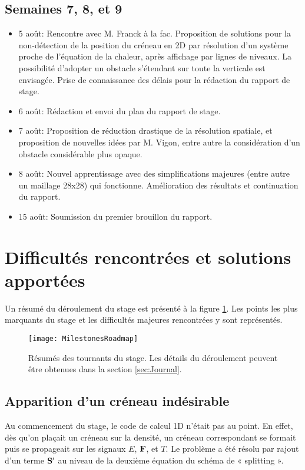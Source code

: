 \subsection{Semaines 7, 8, et 9}
\begin{itemize}
 \item 5 août: Rencontre avec M. Franck à la fac. Proposition de solutions pour la non-détection de la position du créneau en 2D par résolution d'un système proche de l'équation de la chaleur, après affichage par lignes de niveaux. La possibilité d'adopter un obstacle s'étendant sur toute la verticale est envisagée. Prise de connaissance des délais pour la rédaction du rapport de stage.
 \item 6 août: Rédaction et envoi du plan du rapport de stage. 
 \item 7 août: Proposition de réduction drastique de la résolution spatiale, et proposition de nouvelles idées par M. Vigon, entre autre la considération d'un obstacle considérable plus opaque.
 \item 8 août: Nouvel apprentissage avec des simplifications majeures (entre autre un maillage 28x28) qui fonctionne. Amélioration des résultats et continuation du rapport.
 \item 15 août: Soumission du premier brouillon du rapport.
\end{itemize}

\section{Difficultés rencontrées et solutions apportées}

Un résumé du déroulement du stage est présenté à la figure \ref{fig:MilestonesRoadmap}. Les points les plus marquants du stage et les difficultés majeures rencontrées y sont représentés.

\begin{figure}[H]
\centering
\texttt{[image: MilestonesRoadmap]} 
\decoRule
\caption[MilestonesRoadmap]{Résumés des tournants du stage. Les détails du déroulement peuvent être obtenues dans la section \ref{sec:Journal}.}
\label{fig:MilestonesRoadmap}
\end{figure}

\subsection{Apparition d'un créneau indésirable}
Au commencement du stage, le code de calcul 1D n'était pas au point. En effet, dès qu'on plaçait un créneau sur la densité, un créneau correspondant se formait puis se propageait sur les signaux $E$, $\mathbf{F}$, et $T$. Le problème a été résolu par rajout d'un terme $\mathbf{S}^\prime$ au niveau de la deuxième équation du schéma de « splitting ».

